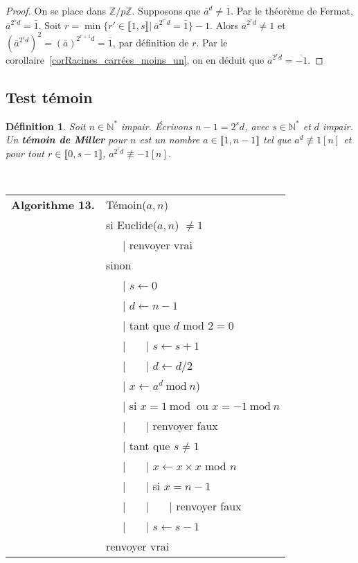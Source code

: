 \documentclass[12pt]{report}
\newtheorem{definition}[thm]{Définition}
\newcommand{\N}{\mathbb{N}}
\newcommand{\Z}{\mathbb{Z}}
\begin{document}
\begin{proof}
On se place dans $\Z/p\Z$. Supposons que $\overline{a}^d\neq \overline{1}$. Par le théorème de Fermat, $\overline{a}^{2^sd}=\overline{1}$. Soit $r=\min\{r'\in\llbracket 1,s\rrbracket|\ \overline{a}^{2^{r'}d}=\overline{1}\}-1$. Alors $\overline{a}^{2^{r}d}\neq 1$ et $(\overline{a}^{2^{r}d})^2=(\overline{a})^{2^{r+1}d}=\overline{1}$, par définition de $r$. Par le corollaire~\ref{corRacines_carrées_moins_un}, on en déduit que $\overline{a}^{2^{r}d}=\overline{-1}$.
\end{proof}

\subsection*{Test témoin}

\begin{definition}
Soit $n\in \N^*$ impair. Écrivons $n-1=2^s d$, avec $s\in\N^*$ et $d$ impair. Un \textbf{témoin de Miller} pour $n$ est un nombre $a\in\llbracket 1,n-1\rrbracket$ tel que $a^d\not\equiv 1[n]$ et pour tout $r\in \llbracket 0,s-1\rrbracket$, $a^{2^rd}\not \equiv -1[n]$.

\end{definition}\\



\begin{tabular}{ll}
\textbf{Algorithme 13.} & Témoin($a,n$)\\
           & si Euclide($a,n$) $\neq 1$ \\
           & \ \ \ {\rm |}  renvoyer vrai \\
           & sinon \\
           & \ \ \ {\rm |} $s \leftarrow 0$ \\
           & \ \ \ {\rm |} $d \leftarrow n-1$ \\
           &  \ \ \ {\rm |} tant que $d$ mod $2=0$   \\
           & \ \ \ {\rm |} \ \ \ {\rm |} $s \leftarrow s+1 $\\
           & \ \ \ {\rm |} \ \ \ {\rm |} $d \leftarrow d/2$ \\
           & \ \ \ {\rm |} $x\leftarrow a^d\mathrm{\ mod\ }n$) \\           
           &  \ \ \ {\rm |} si $x=1\mathrm{\ mod\ }$ ou $x=-1\mathrm{\ mod\ }n$ \\
           & \ \ \ {\rm |} \ \ \ {\rm |} renvoyer faux \\
           & \ \ \ {\rm |} tant que $s \neq 1$ \\
           & \ \ \ {\rm |} \ \ \ {\rm |} $ x\leftarrow x \times x$ mod $n$ \\
           & \ \ \ {\rm |} \ \ \ {\rm |} si $x=n-1$ \\
           & \ \ \ {\rm |} \ \ \ {\rm |} \ \ \ {\rm |} renvoyer faux\\
           & \ \ \ {\rm |} \ \ \ {\rm |} $s \leftarrow s-1$ \\         
           & renvoyer vrai  
\end{tabular}\\
\end{document}
